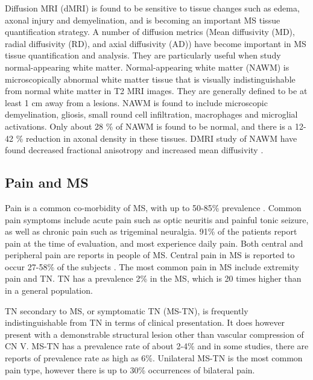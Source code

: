 Diffusion MRI (dMRI) is found to be sensitive to tissue changes such as edema, axonal injury and demyelination, and is becoming an important MS tissue quantification strategy. A number of diffusion metrics (Mean diffusivity (MD), radial diffusivity (RD), and axial diffusivity (AD)) have become important in MS tissue quantification and analysis.  They are particularly useful when study normal-appearing white matter. Normal-appearing white matter (NAWM) is microscopically abnormal white matter tissue that is visually indistinguishable from normal white matter in T2 MRI images. They are generally defined to be at least 1 cm away from a lesions. NAWM is found to include microscopic demyelination, gliosis, small round cell infiltration, macrophages and microglial activations. Only about 28 \% of NAWM is found to be normal, and there is a 12-42 \% reduction in axonal density in these tissues. DMRI study of NAWM have found decreased fractional anisotropy and increased mean diffusivity \cite{Ciccarelli2003d,DeGroot2013}.  

\subsection{Pain and MS}
Pain is a common co-morbidity of MS, with up to 50-85\% prevalence \cite{Osterberg2005}. Common pain symptoms include acute pain such as optic neuritis and painful tonic seizure, as well as chronic pain such as trigeminal neuralgia. 91\% of the patients report pain at the time of evaluation, and most experience daily pain. Both central and peripheral pain are reports in people of MS. Central pain in MS is reported to occur 27-58\% of the subjects
\cite{OConnor2008}. The most common pain in MS include extremity pain and TN. TN has a prevalence 2\% in the MS, which is 20 times higher than in a general population.

TN secondary to MS, or symptomatic TN (MS-TN), is frequently indistinguishable from TN in terms of clinical presentation. It does however present with a demonstrable structural lesion other than vascular compression of CN V. MS-TN has a prevalence rate of about 2-4\% and in some studies, there are reports of prevalence rate as high as 6\%. Unilateral MS-TN is the most common pain type, however there is up to 30\% occurrences of bilateral pain. 

